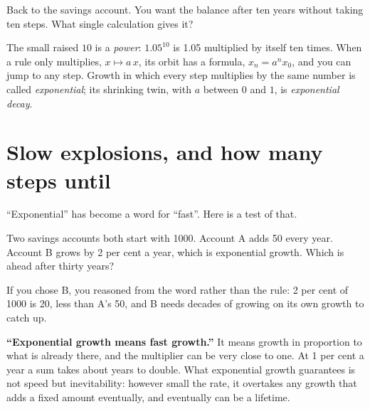 \begin{think}
Back to the savings account. You want the balance after ten years without
taking ten steps. What single calculation gives it?
\end{think}
The small raised $10$ is a \emph{power}: $\num{1.05}^{10}$ is \num{1.05}
multiplied by itself ten times. When a rule only multiplies, $x \mapsto
a\,x$, its orbit has a formula, $x_n = a^n x_0$, and you can jump to any
step. Growth in which every step multiplies by the same number is called
\emph{exponential}; its shrinking twin, with $a$ between $0$ and $1$, is
\emph{exponential decay}.

\section{Slow explosions, and how many steps until}
\label{sec:ch02-until}

\noindent
\enquote{Exponential} has become a word for \enquote{fast}. Here is a test
of that.

\begin{think}
Two savings accounts both start with 1000. Account A adds 50 every year.
Account B grows by 2 per cent a year, which is exponential growth. Which is
ahead after thirty years?
\end{think}
If you chose B, you reasoned from the word rather than the rule: 2 per
cent of 1000 is 20, less than A's 50, and B needs decades of growing on its
own growth to catch up.

\begin{trapbox}
\textbf{\enquote{Exponential growth means fast growth.}} It means growth in
proportion to what is already there, and the multiplier can be very close
to one. At 1 per cent a year a sum takes about 
years to double. What exponential growth guarantees is not speed but
inevitability: however small the rate, it overtakes any growth that adds a
fixed amount \dash{} eventually, and eventually can be a lifetime.
\end{trapbox}


